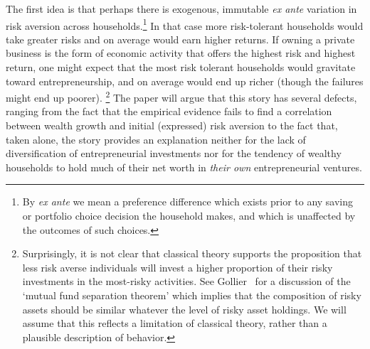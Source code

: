 \documentclass[12pt]{article}
\begin{document}
The first idea is that perhaps there is exogenous, immutable \textit{ex ante}
variation in risk aversion across households.\footnote{%
By \textit{ex ante} we mean a preference difference which exists prior to
any saving or portfolio choice decision the household makes, and which is
unaffected by the outcomes of such choices.} In that case more risk-tolerant
households would take greater risks and on average would earn higher
returns. If owning a private business is the form of economic activity that
offers the highest risk and highest return, one might expect that the most
risk tolerant households would gravitate toward entrepreneurship, and on
average would end up richer (though the failures might end up poorer).%
\footnote{%
Surprisingly, it is not clear that classical theory supports the proposition
that less risk averse individuals will invest a higher proportion of their
risky investments in the most-risky activities. See Gollier~\cite
{gollier:classical} for a discussion of the `mutual fund separation theorem'
which implies that the composition of risky assets should be similar
whatever the level of risky asset holdings. We will assume that this
reflects a limitation of classical theory, rather than a plausible
description of behavior.} The paper will argue that this story has several
defects, ranging from the fact that the empirical evidence fails to find a
correlation between wealth growth and initial (expressed) risk aversion to
the fact that, taken alone, the story provides an explanation neither for
the lack of diversification of entrepreneurial investments nor for the
tendency of wealthy households to hold much of their net worth in \textit{%
their own} entrepreneurial ventures.
\end{document}
